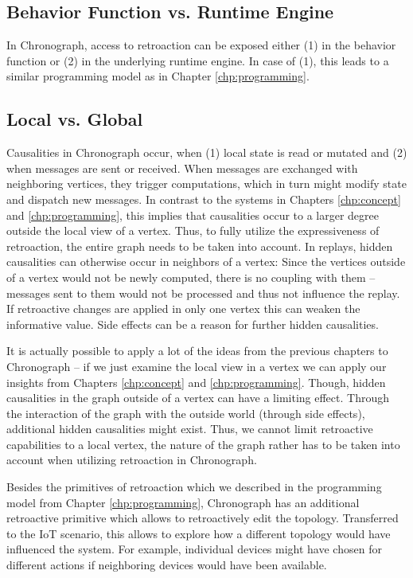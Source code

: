 \subsection{Behavior Function vs. Runtime Engine}
In Chronograph, access to retroaction can be exposed either (1) in the behavior 
function or (2) in the underlying runtime engine. In case of (1), this leads to 
a similar programming model as in Chapter \ref{chp:programming}.


\subsection{Local vs. Global}
Causalities in Chronograph occur, when (1) local state is read or mutated and 
(2) when messages are sent or received.
When messages are exchanged with neighboring vertices, they trigger computations, 
which in turn might modify state and dispatch new messages. In contrast to the 
systems in Chapters \ref{chp:concept} and \ref{chp:programming}, this implies 
that causalities occur to a larger degree outside the local view of a vertex. 
Thus, to fully utilize the expressiveness of retroaction, the entire graph needs 
to be taken into account. In replays, hidden causalities can otherwise occur in 
neighbors of a vertex: Since the vertices outside of a vertex would not be newly
computed, there is no coupling with them -- messages sent to them would not be 
processed and thus not influence the replay. 
If retroactive changes are applied in only one vertex this can weaken the 
informative value. Side effects can be a reason for further hidden causalities.

It is actually possible to apply a lot of the ideas from the previous chapters 
to Chronograph -- if we just examine the local view in a vertex we can apply 
our insights from Chapters \ref{chp:concept} and \ref{chp:programming}. 
Though, hidden causalities in the graph outside of a vertex can have a limiting 
effect. Through the interaction of the graph with the outside world (through 
side effects), additional hidden causalities might exist. Thus, we cannot limit 
retroactive capabilities to a local vertex, the nature of the graph rather has 
to be taken into account when utilizing retroaction in Chronograph.

Besides the primitives of retroaction which we described in the programming 
model from Chapter \ref{chp:programming}, Chronograph has an additional 
retroactive primitive which allows to retroactively edit the topology.
Transferred to the IoT scenario, this allows to explore how a different
topology would have influenced the system.
For example, individual devices might have chosen for different actions if
neighboring devices would have been available.

